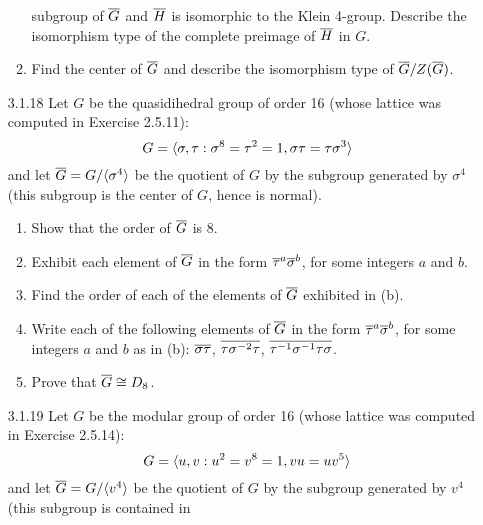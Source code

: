 \begin{enumerate}
\begin{enumerate}
                           subgroup of $\overline{G}$ and $\overline{H}$ is isomorphic to the
                           Klein 4-group. Describe the isomorphism type of the
                           complete preimage of $\overline{H}$ in $G$.
                     \item Find the center of $\overline{G}$ and describe the
                           isomorphism type of $\overline{G}/Z(\overline{G})$.
                  \end{enumerate}
   \item[3.1.18]  Let $G$ be the quasidihedral group of order 16 (whose lattice
                  was computed in Exercise 2.5.11):
                  $$G = \langle \sigma, \tau : \sigma^8 = \tau^2 = 1,
                             \sigma\tau = \tau\sigma^3 \rangle$$
                  and let $\overline{G} = G/\langle \sigma^4 \rangle$ be the quotient of $G$ by
                  the subgroup generated by $\sigma^4$ (this subgroup is the
                  center of $G$, hence is normal).
                  \begin{enumerate}
                     \item Show that the order of $\overline{G}$ is 8.
                     \item Exhibit each element of $\overline{G}$ in the form
                           $\overline{\tau}^a\overline{\sigma}^b$, for some integers $a$ and
                           $b$.
                     \item Find the order of each of the elements of $\overline{G}$
                           exhibited in (b).
                     \item Write each of the following elements of $\overline{G}$ in
                           the form $\overline{\tau}^a\overline{\sigma}^b$, for some integers
                           $a$ and $b$ as in (b): \quad $\overline{\sigma\tau}$, \quad
                           $\overline{\tau\sigma^{-2}\tau}$, \quad
                           $\overline{\tau^{-1}\sigma^{-1}\tau\sigma}$.
                     \item Prove that $\overline{G} \cong D_8$.
                  \end{enumerate}
   \item[3.1.19]  Let $G$ be the modular group of order 16 (whose lattice was
                  computed in Exercise 2.5.14):
                  $$G = \langle u, v : u^2 = v^8 = 1, vu = uv^5 \rangle$$
                  and let $\overline{G} = G/\langle v^4 \rangle$ be the quotient of $G$ by
                  the subgroup generated by $v^4$ (this subgroup is contained in

\end{enumerate}
